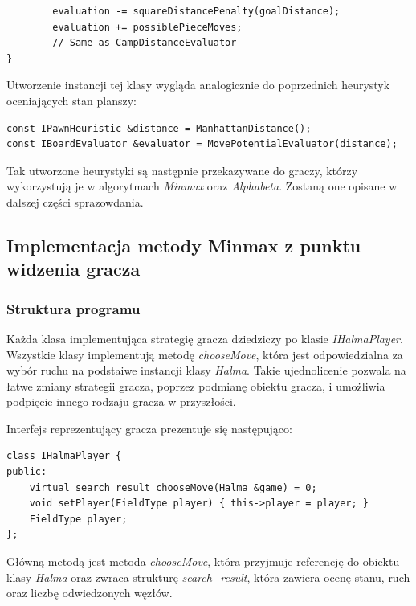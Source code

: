 \documentclass[a4paper, 12pt]{article}
\begin{document}
\begin{itemize}
\begin{lstlisting}
        evaluation -= squareDistancePenalty(goalDistance);
        evaluation += possiblePieceMoves;
        // Same as CampDistanceEvaluator
}
\end{lstlisting}
Utworzenie instancji tej klasy wygląda analogicznie do poprzednich 
heurystyk oceniających stan planszy:
\begin{lstlisting}
const IPawnHeuristic &distance = ManhattanDistance();
const IBoardEvaluator &evaluator = MovePotentialEvaluator(distance);
\end{lstlisting}

\end{itemize}
Tak utworzone heurystyki są następnie przekazywane do graczy, którzy
wykorzystują je w algorytmach \textit{Minmax} oraz \textit{Alphabeta}.
Zostaną one opisane w dalszej części sprazowdania.

\subsection{Implementacja metody Minmax z punktu widzenia gracza}
\subsubsection{Struktura programu}
Każda klasa implementująca strategię gracza dziedziczy po klasie \textit{IHalmaPlayer}.
Wszystkie klasy implementują metodę \textit{chooseMove}, która jest odpowiedzialna za
wybór ruchu na podstaiwe instancji klasy \textit{Halma}. Takie ujednolicenie 
pozwala na łatwe zmiany strategii gracza, poprzez podmianę obiektu gracza, i umożliwia
podpięcie innego rodzaju gracza w przyszłości.

Interfejs reprezentujący gracza prezentuje się następująco:
\begin{lstlisting}
class IHalmaPlayer {
public:
    virtual search_result chooseMove(Halma &game) = 0;
    void setPlayer(FieldType player) { this->player = player; }
    FieldType player;
};
\end{lstlisting}
Główną metodą jest metoda \textit{chooseMove}, która przyjmuje referencję do obiektu
klasy \textit{Halma} oraz zwraca strukturę \textit{search\_result}, która zawiera
ocenę stanu, ruch oraz liczbę odwiedzonych węzłów.
\end{document}
